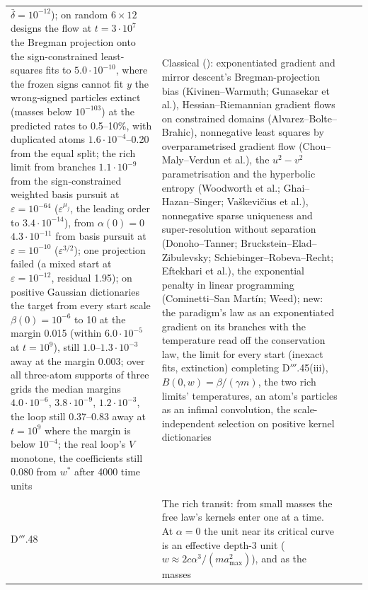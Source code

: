 {\begin{longtable}{@{}>{\raggedright\arraybackslash}p{}>{\raggedright\arraybackslash}p{}%
>{\raggedright\arraybackslash}p{}>{\raggedright\arraybackslash}p{}@{}}
$\bar\delta = 10^{-12}$); on random $6\times12$ designs the flow at $t = 3\cdot10^7$ the Bregman projection onto the
sign-constrained least-squares fits to $5.0\cdot10^{-10}$, where the frozen signs cannot fit $y$ the wrong-signed
particles extinct (masses below $10^{-103}$) at the predicted rates to 0.5--10\%, with duplicated atoms
$1.6\cdot10^{-4}$--0.20 from the equal split; the rich limit from branches $1.1\cdot10^{-9}$ from the sign-constrained
weighted basis pursuit at $\varepsilon = 10^{-64}$ ($\varepsilon^{\mu_j}$, the leading order to $3.4\cdot10^{-14}$),
from $\alpha(0) = 0$ $4.3\cdot10^{-11}$ from basis pursuit at $\varepsilon = 10^{-10}$ ($\varepsilon^{3/2}$); one
projection failed (a mixed start at $\varepsilon = 10^{-12}$, residual 1.95); on positive Gaussian dictionaries the
target from every start scale $\beta(0) = 10^{-6}$ to 10 at the margin 0.015 (within $6.0\cdot10^{-5}$ at
$t = 10^9$), still $1.0$--$1.3\cdot10^{-3}$ away at the margin 0.003; over all three-atom supports of three grids the
median margins $4.0\cdot10^{-6}$, $3.8\cdot10^{-9}$, $1.2\cdot10^{-3}$, the loop still 0.37--0.83 away at $t = 10^9$
where the margin is below $10^{-4}$; the real loop's $V$ monotone, the coefficients still 0.080 from $w^*$ after 4000
time units
& Classical (\cite{S74}): exponentiated gradient and mirror descent's Bregman-projection bias (Kivinen--Warmuth;
Gunasekar et al.), Hessian--Riemannian gradient flows on constrained domains (Alvarez--Bolte--Brahic), nonnegative least
squares by overparametrised gradient flow (Chou--Maly--Verdun et al.), the $u^2 - v^2$ parametrisation and the
hyperbolic entropy (Woodworth et al.; Ghai--Hazan--Singer; Va\v{s}kevi\v{c}ius et al.), nonnegative sparse uniqueness
and super-resolution without separation (Donoho--Tanner; Bruckstein--Elad--Zibulevsky; Schiebinger--Robeva--Recht;
Eftekhari et al.), the exponential penalty in linear programming (Cominetti--San Mart\'in; Weed); new: the paradigm's
law as an exponentiated gradient on its branches with the temperature read off the conservation law, the limit for
every start (inexact fits, extinction) completing D$'''$.45(iii), $B(0,w) = \beta/(\gamma m)$, the two rich limits'
temperatures, an atom's particles as an infimal convolution, the scale-independent selection on positive kernel
dictionaries\\
\addlinespace[0.5pt]
D$'''$.48 & The rich transit: from small masses the free law's kernels enter one at a time. At $\alpha = 0$ the unit near
its critical curve is an effective depth-3 unit ($w\approx2c\alpha^3/(ma_{\max}^2)$), and as the masses

\end{longtable}}
